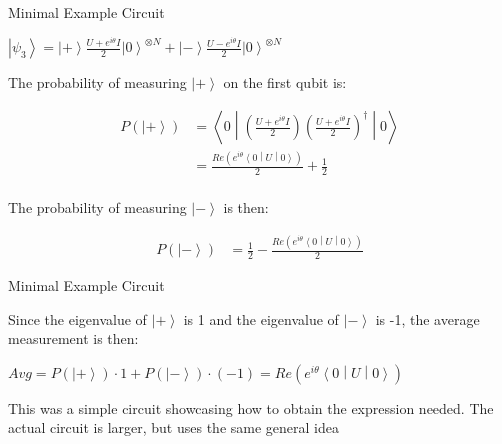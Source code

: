 \documentclass[professionalfonts]{beamer}
\newcommand{\ket}[1]{\ensuremath{\left|#1\right\rangle}}
\newcommand{\sandwich}[3]{\left< #1 \middle\vert #2 \middle\vert #3 \right>}
\newcommand{\paren}[1]{\left( #1 \right)}
\newcommand{\elec}{N}
\newcommand{\SubItem}[1]{
    {\setlength\itemindent{15pt} \item[*] #1}
}
\begin{document}
\begin{frame}{Minimal Example Circuit}
	\begin{itemize}
		\item $\ket{\psi_3}
					= \ket + \frac{U + e^{i\theta}I}{2}\ket 0^{\otimes\elec}
					+ \ket - \frac{U - e^{i\theta}I}{2}\ket 0^{\otimes\elec}$
			\SubItem{The probability of measuring $\ket +$ on the first qubit is:}
\begin{equation*}
	\begin{split}
		P(\ket +)
		&= \sandwich 0 {
			\paren{\frac{U + e^{i\theta}I}{2}}
			\paren{\frac{U + e^{i\theta}I}{2}}^\dagger
		} 0 \\
		&= \frac{Re \paren{e^{i\theta}\sandwich 0 { U } 0}}{2}
		+ \frac{1}{2} \\
	\end{split}
\end{equation*}
			\SubItem{The probability of measuring $\ket -$ is then:}
\begin{equation*}
	\begin{split}
		P(\ket -)
		&= \frac{1}{2} - \frac{Re \paren{e^{i\theta}\sandwich 0 { U } 0}}{2}
	\end{split}
\end{equation*}
	\end{itemize}
\end{frame}


\begin{frame}{Minimal Example Circuit}
	\begin{itemize}
		\item Since the eigenvalue of $\ket +$ is 1 and the eigenvalue of $\ket -$ is -1, the average measurement is then:
			\SubItem{$Avg = P(\ket +) \cdot 1 + P(\ket -) \cdot (-1) = Re\paren{e^{i\theta}\sandwich 0 {U} 0}$}

		\vspace{10pt}
		\item This was a simple circuit showcasing how to obtain the expression needed. The actual circuit is larger, but uses the same general idea
\begin{equation*}
	\begin{split}
	\end{split}
\end{equation*}
	\end{itemize}
\end{frame}
\end{document}
